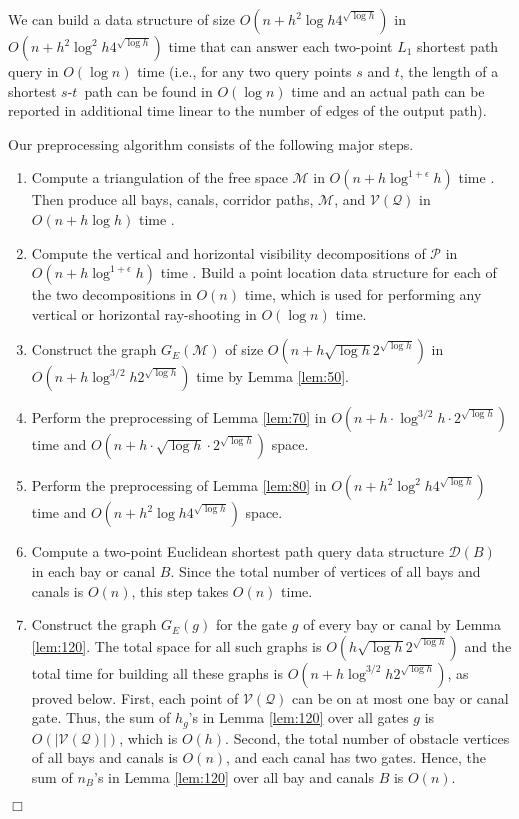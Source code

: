 \documentclass[english,runningheads,11pt]{llncs}
\def\calP{\mathcal{P}}
\def\calM{\mathcal{M}}
\def\calQ{\mathcal{Q}}
\def\calD{\mathcal{D}}
\def\calV{\mathcal{V}}
\def\st{$s$-$t$}
\newenvironment{proof}{\noindent {\textbf{Proof:}}\rm}{\hfill $\Box$\rm}
\begin{document}
\begin{theorem}\label{theo:20}
We can build a data structure of size $O(n+h^2\log h4^{\sqrt{\log
h}})$ in $O(n+h^2\log^{2}h4^{\sqrt{\log h}})$ time that can
answer each two-point $L_1$ shortest path query in $O(\log n)$ time (i.e., for
any two query points $s$ and $t$, the length of a shortest \st\ path can be found in $O(\log n)$
time and an actual path can be reported in additional time linear to the number of edges of the output path).
\end{theorem}
\begin{proof}
Our preprocessing algorithm consists of the following major steps.

\begin{enumerate}
\item
Compute a triangulation of the free space $\calM$ in
$O(n+h\log^{1+\epsilon} h)$ time
\cite{ref:Bar-YehudaTr94,ref:ChazelleTr91}. Then produce
all bays, canals, corridor paths, $\calM$, and $\calV(\calQ)$ in
$O(n+h\log h)$ time
\cite{ref:ChenA11ESA,ref:ChenCo12arXiv,ref:ChenL113STACS}.
\item
Compute the vertical and horizontal visibility decompositions of $\calP$
in $O(n+h\log^{1+\epsilon} h)$ time \cite{ref:Bar-YehudaTr94,ref:ChazelleTr91}.
Build a point location data structure \cite{ref:EdelsbrunnerOp86,ref:KirkpatrickOp83}
for each of the two decompositions in $O(n)$ time, which is used for
performing any vertical or horizontal ray-shooting in $O(\log n)$
time.
\item
Construct the graph $G_E(\calM)$ of size $O(n+h\sqrt{\log
h}2^{\sqrt{\log h}})$ in $O(n+h\log^{3/2} h2^{\sqrt{\log h}})$  time
by Lemma \ref{lem:50}.

\item
Perform the preprocessing of Lemma \ref{lem:70} in
$O(n+h\cdot \log^{3/2} h \cdot 2^{\sqrt{\log h}})$ time and
$O(n+h\cdot \sqrt{\log h} \cdot 2^{\sqrt{\log h}})$ space.

\item
Perform the preprocessing of Lemma \ref{lem:80} in
$O(n+h^2\log^{2} h 4^{\sqrt{\log h}})$ time and
$O(n+h^2\log h4^{\sqrt{\log h}})$ space.

\item
Compute a two-point Euclidean shortest path
query data structure $\calD(B)$ in each bay or canal $B$. Since the
total number of vertices of all bays and canals is $O(n)$, this
step takes $O(n)$ time.

\item
Construct the graph $G_E(g)$ for the gate $g$ of every bay or canal by Lemma
\ref{lem:120}. The total space for all such graphs is $O(h\sqrt{\log
h}2^{\sqrt{\log h}})$ and the total time for building all these graphs
is $O(n+h\log^{3/2} h2^{\sqrt{\log h}})$, as proved below.
First, each point of $\calV(\calQ)$ can be on at most one
bay or canal gate. Thus, the sum of $h_g$'s in Lemma \ref{lem:120} over all
gates $g$ is $O(|\calV(\calQ)|)$, which is $O(h)$. Second, the total number
of obstacle vertices of all bays and canals  is $O(n)$, and each canal has two
gates. Hence, the sum of $n_B$'s in Lemma \ref{lem:120} over all
bay and canals $B$ is $O(n)$.



\end{enumerate}
\end{proof}
\end{document}
